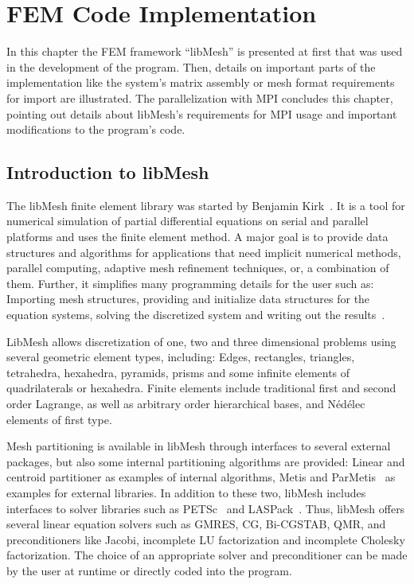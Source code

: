 \section{FEM Code Implementation}
 In this chapter the FEM framework ``libMesh'' is presented at first that was used in the development of the program. Then, details on important parts of the implementation like the system's matrix assembly or mesh format requirements for import are illustrated. The parallelization with MPI concludes this chapter, pointing out details about libMesh's requirements for MPI usage and important modifications to the program's code.
 
 
 
 \subsection{Introduction to libMesh}\label{sec:Impl-Intro}
 The libMesh finite element library was started by Benjamin Kirk~\cite{kirk2007adaptive}. It is a tool for numerical simulation of partial differential equations on serial and parallel platforms and uses the finite element method. A major goal is to provide data structures and algorithms for applications that need implicit numerical methods, parallel computing, adaptive mesh refinement techniques, or, a combination of them. Further, it simplifies many programming details for the user such as: Importing mesh structures, providing and initialize data structures for the equation systems, solving the discretized system and writing out the results~\cite{kirk2013case}.
 
 LibMesh allows discretization of one, two and three dimensional problems using several geometric element types, including: Edges, rectangles, triangles, tetrahedra, hexahedra, pyramids, prisms and some infinite elements of quadrilaterals or hexahedra. Finite elements include traditional first and second order Lagrange, as well as arbitrary order hierarchical bases, and N\'{e}d\'{e}lec elements of first type.
 
 Mesh partitioning is available in libMesh through interfaces to several external packages, but also some internal partitioning algorithms are provided: Linear and centroid partitioner as examples of internal algorithms, Metis and ParMetis~\cite{karypis1998fast} as examples for external libraries. In addition to these two, libMesh includes interfaces to solver libraries such as PETSc~\cite{petsc-web-page} and LASPack~\cite{laspack2015url}. Thus, libMesh offers several linear equation solvers such as GMRES, CG, Bi-CGSTAB, QMR, and preconditioners like Jacobi, incomplete LU factorization and incomplete Cholesky factorization. The choice of an appropriate solver and preconditioner can be made by the user at runtime or directly coded into the program.
 
